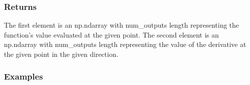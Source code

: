 \documentclass[letterpaper,10pt,english]{sphinxmanual}
\begin{document}
\begin{fulllineitems}
\begin{fulllineitems}
\subsubsection{Returns}
\label{\detokenize{autodiff:returns}}\begin{description}
\sphinxAtStartPar
The first element is an np.ndarray with num\_outputs length representing the function’s value
evaluated at the given point.  The second element is an np.ndarray with num\_outputs length
representing the value of the derivative at the given point in the given direction.

\end{description}


\subsubsection{Examples}
\label{\detokenize{autodiff:examples}}
\begin{sphinxVerbatim}[commandchars=\\\{\}]
         
    
  \PYG{p}{[}\PYG{p}{]}
  \PYG{p}{[}\PYG{p}{]}
 
  
  
  \PYG{p}{[}\PYG{p}{]}
  \PYG{p}{[}\PYG{p}{]}
 
\end{sphinxVerbatim}


\end{fulllineitems}
\end{fulllineitems}
\end{document}
